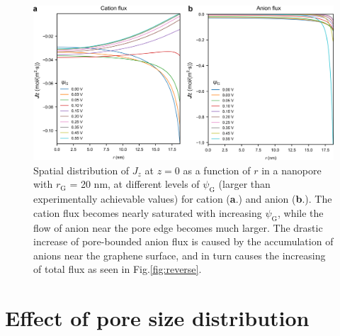 \documentclass[manuscript=suppinfo,email=true, hyperref=true, keywords=false]{achemso}
\newcommand{\Fig}{Fig.}
\begin{document}
\begin{figure}[htbp]
  \centering
  \includegraphics[width=0.8\linewidth]{img/SI-flux-larger.png}
  \caption{Spatial distribution of $J_{z}$ at $z = 0$ as a function
    of $r$ in a nanopore with $r_{\mathrm{G}}$ = 20 nm, at different
    levels of $\psi_{\mathrm{G}}$ (larger than experimentally
    achievable values) for cation (\textbf{a}.) and anion
    (\textbf{b}.). The cation flux becomes nearly saturated with
    increasing $\psi_{\mathrm{G}}$, while the flow of anion near the
    pore edge becomes much larger. The drastic increase of
    pore-bounded anion flux is caused by the accumulation of anions
    near the graphene surface, and in turn causes the increasing of
    total flux as seen in \Fig \ref{fig:reverse}.}
  \label{fig:large-V}
\end{figure}
\clearpage{}

\section{Effect of pore size distribution}
\label{sec:pore-dist}
\end{document}
